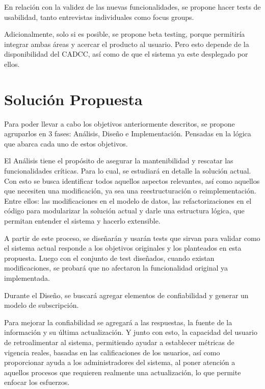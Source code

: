     \par En relación con la validez de las nuevas funcionalidades, se propone hacer tests de usabilidad, tanto entrevistas individuales como focus groups.
    
    \par Adicionalmente, solo si es posible, se propone beta testing, porque permitiría integrar ambas áreas y acercar el producto al usuario. Pero esto depende de la disponibilidad del CADCC, así como de que el sistema ya este desplegado por ellos.

\section{Solución Propuesta}\label{sec:intro-sol}
    \par Para poder llevar a cabo los objetivos anteriormente descritos, se propone agruparlos en 3 fases: Análisis, Diseño e Implementación. Pensadas en la lógica que abarca cada uno de estos objetivos.
    
    \par El Análisis tiene el propósito de asegurar la mantenibilidad y rescatar las funcionalidades críticas. Para lo cual, se estudiará en detalle la solución actual. Con esto se busca identificar todos aquellos aspectos relevantes, así como aquellos que necesiten una modificación, ya sea una reestructuración o reimplementación. Entre ellos: las modificaciones en el modelo de datos, las refactorizaciones en el código para modularizar la solución actual y darle una estructura lógica, que permitan entender el sistema y hacerlo extensible.
    
    \par A partir de este proceso, se diseñarán y usarán tests que sirvan para validar como el sistema actual responde a los objetivos originales y los planteados en esta propuesta. Luego con el conjunto de test diseñados, cuando existan modificaciones, se probará que no afectaron la funcionalidad original ya implementada.
    
    \par Durante el Diseño,  se buscará agregar elementos de confiabilidad y generar un modelo de subscripción.
    \par Para mejorar la confiabilidad se agregará a las respuestas, la fuente de la información y su última actualización. Y junto con esto, la capacidad del usuario de retroalimentar al sistema, permitiendo ayudar a establecer métricas de vigencia reales, basadas en las calificaciones de los usuarios, así como proporcionar ayuda a los administradores del sistema, al poner atención a aquellos procesos que requieren realmente una actualización, lo que permite enfocar los esfuerzos.
    

